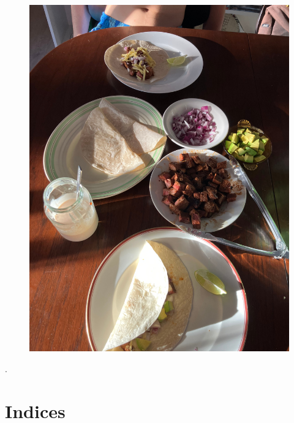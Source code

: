 \documentclass[]{article}
\begin{document}
\newpage\begin{figure}[H]
\begin{center}\hyperref[rec:Steak Tacos]{\includegraphics[keepaspectratio,width=\textwidth,height=\textheight]{Gallery/Steak Tacos}}\caption*{}\label{fig:Steak Tacos}\end{center}
\end{figure}


\newpage
\color{white}.\color{black}
\vspace{5cm}
\part{\Huge Indices}
\newpage
\printindex
\printindex[prop]
\printindex[cuisine]
\printindex[key]
\end{document}
